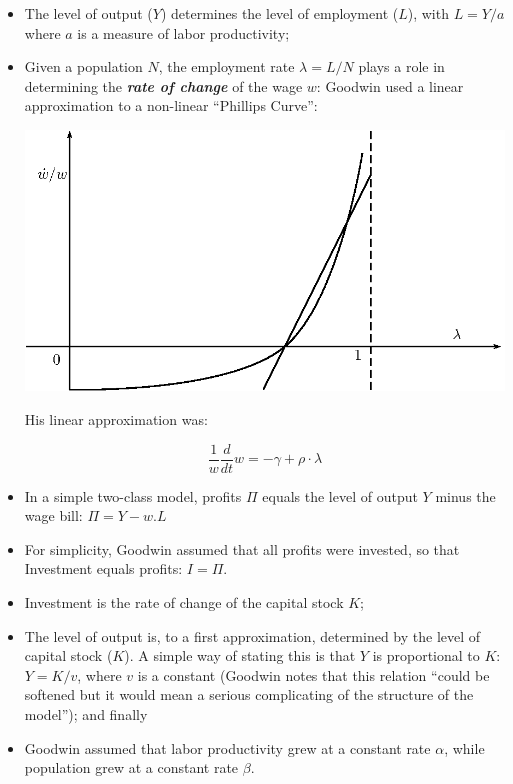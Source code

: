 \begin{itemize}

\item The level of output ($Y$) determines the level of employment ($L$), with $L=Y/a$ where $a$ is a measure of labor productivity;
\item Given a population $N$, the employment rate $\lambda=L/N$ plays
a role in determining the {\bf\em rate of change} of the wage $w$:
Goodwin used a linear approximation to a non-linear ``Phillips
Curve'': 

\begin{center}
  \includegraphics{images/PhillipsCurve.eps}
\end{center}

His linear approximation was:

\begin{displaymath}
\frac1w\frac{d}{dt}w=-\gamma+\rho\cdot\lambda
\end{displaymath}

\item In a simple two-class model, profits $\Pi$ equals the level of
output $Y$ minus the wage bill: $\Pi=Y-w.L$ 
\item For simplicity, Goodwin assumed that all profits were invested, so that Investment equals profits: $I=\Pi$.
\item Investment is the rate of change of the capital stock $K$;
\item The level of output is, to a first approximation, determined by
the level of capital stock ($K$). A simple way of stating this is that
$Y$ is proportional to $K$: $Y=K/v$, where $v$ is a constant (Goodwin
notes that this relation ``could be softened but it would mean a
serious complicating of the structure of the model''); and finally 
\item Goodwin assumed that labor productivity grew at a constant rate $\alpha$, while population grew at a constant rate $\beta$.


\end{itemize}
